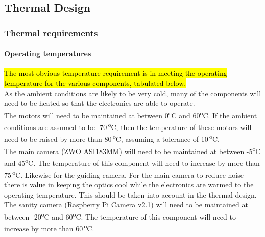 \pagebreak
\subsection{Thermal Design} 
\label{Thermal_section}















\subsubsection{Thermal requirements}

\paragraph{Operating temperatures}

\hl{The most obvious temperature requirement is in meeting the operating temperature for the various components, tabulated below.}\\ 



As the ambient conditions are likely to be very cold, many of the components will need to be heated so that the electronics are able to operate.\\

The motors will need to be maintained at between 0\textsuperscript{o}C and 60\textsuperscript{o}C. If the ambient conditions are assumed to be -70\,\textsuperscript{o}C, then the temperature of these motors will need to be raised by more than 80\,\textsuperscript{o}C, assuming a tolerance of 10\,\textsuperscript{o}C.\\

The main camera (ZWO ASI183MM) will need to be maintained at between -5\textsuperscript{o}C and 45\textsuperscript{o}C. The temperature of this component will need to increase by more than 75\,\textsuperscript{o}C. Likewise for the guiding camera. For the main camera to reduce noise there is value in keeping the optics cool while the electronics are warmed to the operating temperature. This should be taken into account in the thermal design.\\

The sanity camera (Raspberry Pi Camera v2.1) will need to be maintained at between -20\textsuperscript{o}C and 60\textsuperscript{o}C. The temperature of this component will need to increase by more than 60\,\textsuperscript{o}C.\\

